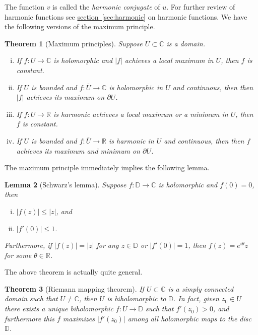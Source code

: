 \documentclass[12pt,openany]{book}
\newcommand{\sabs}[1]{\lvert {#1} \rvert}
\newcommand{\C}{{\mathbb{C}}}
\newcommand{\R}{{\mathbb{R}}}
\newcommand{\D}{{\mathbb{D}}}
\newcommand{\myindex}[1]{#1\index{#1}}
\theoremstyle{plain}
\newtheorem{thm}{Theorem}[section]
\newtheorem{lemma}[thm]{Lemma}
\theoremstyle{remark}
\theoremstyle{definition}
\theoremstyle{exercise}
\theoremstyle{example}
\newcommand{\sectionref}[1]{\hyperref[#1]{section~\ref*{#1}}}
\begin{document}
The function $v$ is called the \emph{\myindex{harmonic conjugate}} of
$u$.  For further review of harmonic functions see
\sectionref{sec:harmonic} on harmonic functions.
We have the following versions of the maximum principle.

\begin{thm}[Maximum principles]
Suppose $U \subset \C$ is a domain.
\begin{enumerate}[(i)]
\item
If $f \colon U \to \C$ is holomorphic and $\sabs{f}$
achieves a local maximum in $U$, then $f$ is constant.
\item
If $U$ is bounded and $f \colon \overline{U} \to \C$ is holomorphic in $U$
and continuous, then then $\sabs{f}$ achieves its maximum on $\partial U$.
\item
If $f \colon U \to \R$ is harmonic 
achieves a local maximum or a minimum in $U$, then $f$ is constant.
\item
If $U$ is bounded and $f \colon \overline{U} \to \R$ is harmonic in $U$
and continuous, then then $f$ achieves its maximum and minimum on $\partial U$.
\end{enumerate}
\end{thm}

The maximum principle immediately implies the following lemma.

\pagebreak[2]

\begin{lemma}[Schwarz's lemma]
Suppose $f \colon \D \to \C$ is holomorphic and $f(0) = 0$,
then 
\begin{enumerate}[(i)]
\item $\sabs{f(z)} \leq \sabs{z}$, and
\item $\sabs{f'(0)} \leq 1$.
\end{enumerate}
Furthermore, if $\sabs{f(z)} = \sabs{z}$ for any $z \in \D$
or $\sabs{f'(0)} = 1$, then $f(z) =
e^{i\theta} z$ for some $\theta \in \R$.
\end{lemma}

The above theorem is actually quite general.

\begin{thm}[Riemann mapping theorem]
If $U \subset \C$ is a simply connected domain such that $U \neq \C$,
then $U$ is biholomorphic to $\D$.  In fact, given $z_0 \in U$
there exists a unique biholomorphic $f \colon U \to \D$
such that $f'(z_0) > 0$, and furthermore this $f$
maximizes $\sabs{f'(z_0)}$ among all holomorphic maps to the disc $\D$.
\end{thm}
\end{document}

